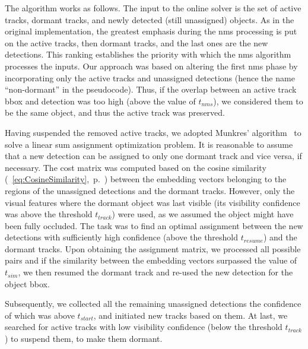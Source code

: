 The algorithm works as follows. The input to the online solver is the set of active tracks, dormant tracks, and newly detected (still unassigned) objects. As in the original implementation, the greatest emphasis during the \gls{nms} processing is put on the active tracks, then dormant tracks, and the last ones are the new detections. This ranking establishes the priority with which the \gls{nms} algorithm processes the inputs. Our approach was based on altering the first \gls{nms} phase by incorporating only the active tracks and unassigned detections (hence the name ``non-dormant'' in the pseudocode). Thus, if the overlap between an active track \gls{bbox} and detection was too high (above the value of $t_{nms}$), we considered them to be the same object, and thus the active track was preserved.

Having suspended the removed active tracks, we adopted Munkres' algorithm~\cite{munkres1957assignment} to solve a linear sum assignment optimization problem. It is reasonable to assume that a new detection can be assigned to only one dormant track and vice versa, if necessary. The cost matrix was computed based on the cosine similarity (\eqtext{}~\ref{eq:CosineSimilarity},~p.~\pageref{eq:CosineSimilarity}) between the embedding vectors belonging to the regions of the unassigned detections and the dormant tracks. However, only the visual features where the dormant object was last visible (its visibility confidence was above the threshold $t_{track}$) were used, as we assumed the object might have been fully occluded. The task was to find an optimal assignment between the new detections with sufficiently high confidence (above the threshold $t_{resume}$) and the dormant tracks. Upon obtaining the assignment matrix, we processed all possible pairs and if the similarity between the embedding vectors surpassed the value of $t_{sim}$, we then resumed the dormant track and re-used the new detection for the object \gls{bbox}.

Subsequently, we collected all the remaining unassigned detections the confidence of which was above $t_{start}$, and initiated new tracks based on them. At last, we searched for active tracks with low visibility confidence (below the threshold $t_{track}$) to suspend them, to make them dormant.


